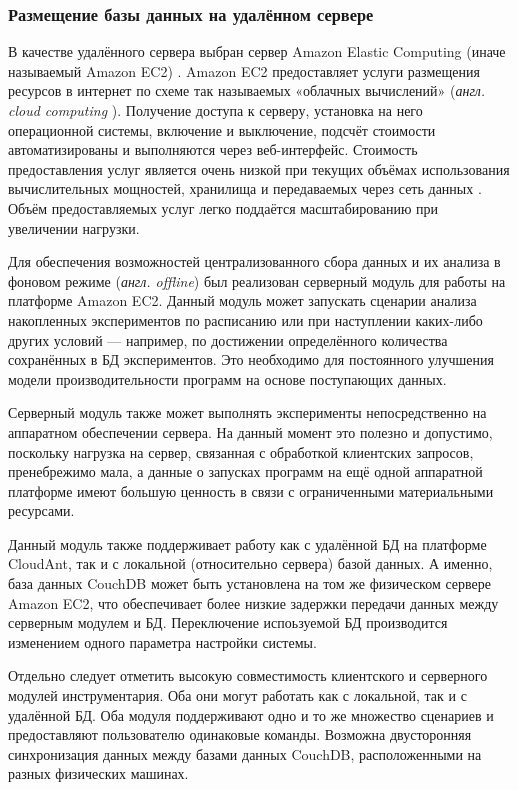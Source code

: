 \subsubsection{Размещение базы данных на удалённом сервере}

В качестве удалённого сервера выбран сервер Amazon Elastic Computing (иначе называемый Amazon EC2) \cite{amazon-ec2}. Amazon EC2 предоставляет услуги размещения ресурсов в интернет по схеме так называемых «облачных вычислений» (\textit{англ. cloud computing} \cite{cloud-computing}). Получение доступа к серверу, установка на него операционной системы, включение и выключение, подсчёт стоимости автоматизированы и выполняются через веб-интерфейс. Стоимость предоставления услуг является очень низкой при текущих объёмах использования вычислительных мощностей, хранилища и передаваемых через сеть данных \cite{amazon-billing}. Объём предоставляемых услуг легко поддаётся масштабированию при увеличении нагрузки.

Для обеспечения возможностей централизованного сбора данных и их анализа в фоновом режиме (\textit{англ. offline}) был реализован серверный модуль для работы на платформе Amazon EC2. Данный модуль может запускать сценарии анализа накопленных экспериментов по расписанию или при наступлении каких-либо других условий --- например, по достижении определённого количества сохранённых в БД экспериментов. Это необходимо для постоянного улучшения модели производительности программ на основе поступающих данных.

Серверный модуль также может выполнять эксперименты непосредственно на аппаратном обеспечении сервера. На данный момент это полезно и допустимо, поскольку нагрузка на сервер, связанная с обработкой клиентских запросов, пренебрежимо мала, а данные о запусках программ на ещё одной аппаратной платформе имеют большую ценность в связи с ограниченными материальными ресурсами.

Данный модуль также поддерживает работу как с удалённой БД на платформе CloudAnt, так и с локальной (относительно сервера) базой данных. А именно, база данных CouchDB может быть установлена на том же физическом сервере Amazon EC2, что обеспечивает более низкие задержки передачи данных между серверным модулем и БД. Переключение испоьзуемой БД производится изменением одного параметра настройки системы.

Отдельно следует отметить высокую совместимость клиентского и серверного модулей инструментария. Оба они могут работать как с локальной, так и с удалённой БД. Оба модуля поддерживают одно и то же множество сценариев и предоставляют пользователю одинаковые команды. Возможна двусторонняя синхронизация данных между базами данных CouchDB, расположенными на разных физических машинах.

